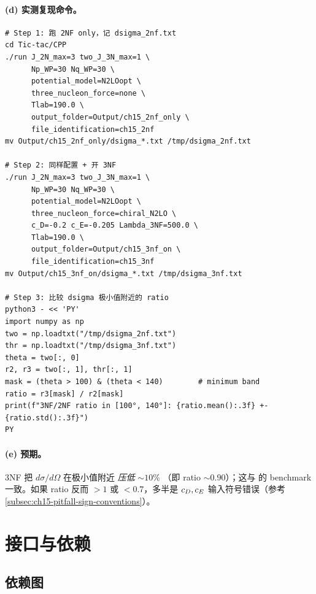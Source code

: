 \begin{numericalbox}[label={box:ch15-numerical-closure}]
\paragraph{(d) 实测复现命令。}
\begin{lstlisting}[style=config]
# Step 1: 跑 2NF only，记 dsigma_2nf.txt
cd Tic-tac/CPP
./run J_2N_max=3 two_J_3N_max=1 \
      Np_WP=30 Nq_WP=30 \
      potential_model=N2LOopt \
      three_nucleon_force=none \
      Tlab=190.0 \
      output_folder=Output/ch15_2nf_only \
      file_identification=ch15_2nf
mv Output/ch15_2nf_only/dsigma_*.txt /tmp/dsigma_2nf.txt

# Step 2: 同样配置 + 开 3NF
./run J_2N_max=3 two_J_3N_max=1 \
      Np_WP=30 Nq_WP=30 \
      potential_model=N2LOopt \
      three_nucleon_force=chiral_N2LO \
      c_D=-0.2 c_E=-0.205 Lambda_3NF=500.0 \
      Tlab=190.0 \
      output_folder=Output/ch15_3nf_on \
      file_identification=ch15_3nf
mv Output/ch15_3nf_on/dsigma_*.txt /tmp/dsigma_3nf.txt

# Step 3: 比较 dsigma 极小值附近的 ratio
python3 - << 'PY'
import numpy as np
two = np.loadtxt("/tmp/dsigma_2nf.txt")
thr = np.loadtxt("/tmp/dsigma_3nf.txt")
theta = two[:, 0]
r2, r3 = two[:, 1], thr[:, 1]
mask = (theta > 100) & (theta < 140)        # minimum band
ratio = r3[mask] / r2[mask]
print(f"3NF/2NF ratio in [100°, 140°]: {ratio.mean():.3f} +- {ratio.std():.3f}")
PY
\end{lstlisting}

\paragraph{(e) 预期。}
3NF 把 \(d\sigma/d\Omega\) 在极小值附近 \emph{压低} \(\sim 10\%\)
（即 ratio \(\sim 0.90\)）；这与 \cite{Witala1988, Miller2023PRC} 的
benchmark 一致。如果 ratio 反而 \(>1\) 或 \(<0.7\)，多半是
\(c_D, c_E\) 输入符号错误（参考 \cref{subsec:ch15-pitfall-sign-conventions}）。
\end{numericalbox}

\section{接口与依赖}
\label{sec:ch15-interface}

\subsection{依赖图}
\label{subsec:ch15-dep-graph}

